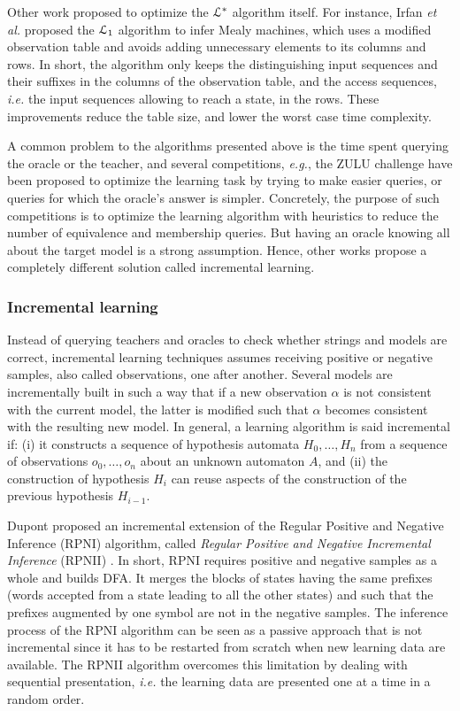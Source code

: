 Other work proposed to optimize the $\EuScript{L}^*$ algorithm
itself. For instance, Irfan \emph{et al.} proposed the $\EuScript{L}_1$
algorithm \cite{irfan12} to infer Mealy machines, which uses a
modified observation table and avoids adding unnecessary elements
to its columns and rows. In short, the algorithm only keeps the
distinguishing input sequences and their suffixes in the columns
of the observation table, and the access sequences, \emph{i.e.} the
input sequences allowing to reach a state, in the rows. These
improvements reduce the table size, and lower the worst case time
complexity.

A common problem to the algorithms presented above is the time
spent querying the oracle or the teacher, and several
competitions, \emph{e.g.}, the ZULU challenge \cite{zulu} have been
proposed to optimize the learning task by trying to make easier
queries, or queries for which the oracle's answer is simpler.
Concretely, the purpose of such competitions is to optimize the
learning algorithm with heuristics to reduce the number of
equivalence and membership queries. But having an oracle knowing
all about the target model is a strong assumption. Hence, other
works propose a completely different solution called incremental
learning.

\subsubsection{Incremental learning}
\label{sec:active-increment}

Instead of querying teachers and oracles to check whether strings
and models are correct, incremental learning techniques assumes
receiving positive or negative samples, also called observations,
one after another.  Several models are incrementally built in
such a way that if a new observation $\alpha$ is not consistent
with the current model, the latter is modified such that $\alpha$
becomes consistent with the resulting new model.  In general, a
learning algorithm is said incremental if: (i) it constructs a
sequence of hypothesis automata $H_0, \dots, H_n$ from a sequence
of observations $o_0, \dots, o_n$  about an unknown automaton
$A$, and (ii) the construction of hypothesis $H_i$ can reuse
aspects of the construction of the previous hypothesis $H_{i-1}$.

Dupont proposed an incremental extension of the Regular Positive
and Negative Inference (RPNI) algorithm, called \textit{Regular
Positive and Negative Incremental Inference} (RPNII)
\cite{Dupont96incrementalregular}. In short, RPNI requires
positive and negative samples as a whole and builds DFA. It
merges the blocks of states having the same prefixes (words
accepted from a state leading to all the other states) and such
that the prefixes augmented by one symbol are not in the negative
samples. The inference process of the RPNI algorithm can be seen
as a passive approach that is not incremental since it has to
be restarted from scratch when new learning data are available.
The RPNII algorithm overcomes this limitation by dealing with
sequential presentation, \emph{i.e.} the learning data are presented one
at a time in a random order.

